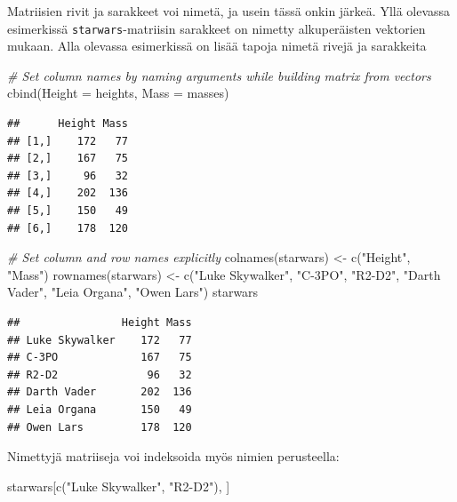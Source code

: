 \documentclass[
]{book}
\newenvironment{Shaded}{\begin{snugshade}}{\end{snugshade}}
\newcommand{\AttributeTok}[1]{\textcolor[rgb]{0.77,0.63,0.00}{#1}}
\newcommand{\CommentTok}[1]{\textcolor[rgb]{0.56,0.35,0.01}{\textit{#1}}}
\newcommand{\FunctionTok}[1]{\textcolor[rgb]{0.00,0.00,0.00}{#1}}
\newcommand{\NormalTok}[1]{#1}
\newcommand{\OtherTok}[1]{\textcolor[rgb]{0.56,0.35,0.01}{#1}}
\newcommand{\StringTok}[1]{\textcolor[rgb]{0.31,0.60,0.02}{#1}}
\begin{document}
Matriisien rivit ja sarakkeet voi nimetä, ja usein tässä onkin järkeä. Yllä olevassa esimerkissä \texttt{starwars}-matriisin sarakkeet on nimetty alkuperäisten vektorien mukaan. Alla olevassa esimerkissä on lisää tapoja nimetä rivejä ja sarakkeita

\begin{Shaded}
\begin{Highlighting}[]
\CommentTok{\# Set column names by naming arguments while building matrix from vectors}
\FunctionTok{cbind}\NormalTok{(}\AttributeTok{Height =}\NormalTok{ heights, }\AttributeTok{Mass =}\NormalTok{ masses)}
\end{Highlighting}
\end{Shaded}

\begin{verbatim}
##      Height Mass
## [1,]    172   77
## [2,]    167   75
## [3,]     96   32
## [4,]    202  136
## [5,]    150   49
## [6,]    178  120
\end{verbatim}

\begin{Shaded}
\begin{Highlighting}[]
\CommentTok{\# Set column and row names explicitly}
\FunctionTok{colnames}\NormalTok{(starwars) }\OtherTok{\textless{}{-}} \FunctionTok{c}\NormalTok{(}\StringTok{"Height"}\NormalTok{, }\StringTok{"Mass"}\NormalTok{)}
\FunctionTok{rownames}\NormalTok{(starwars) }\OtherTok{\textless{}{-}} \FunctionTok{c}\NormalTok{(}\StringTok{"Luke Skywalker"}\NormalTok{, }\StringTok{"C{-}3PO"}\NormalTok{, }\StringTok{"R2{-}D2"}\NormalTok{, }\StringTok{"Darth Vader"}\NormalTok{, }\StringTok{"Leia Organa"}\NormalTok{, }\StringTok{"Owen Lars"}\NormalTok{)}
\NormalTok{starwars}
\end{Highlighting}
\end{Shaded}

\begin{verbatim}
##                Height Mass
## Luke Skywalker    172   77
## C-3PO             167   75
## R2-D2              96   32
## Darth Vader       202  136
## Leia Organa       150   49
## Owen Lars         178  120
\end{verbatim}

Nimettyjä matriiseja voi indeksoida myös nimien perusteella:

\begin{Shaded}
\begin{Highlighting}[]
\NormalTok{starwars[}\FunctionTok{c}\NormalTok{(}\StringTok{"Luke Skywalker"}\NormalTok{, }\StringTok{"R2{-}D2"}\NormalTok{), ]}
\end{Highlighting}
\end{Shaded}
\end{document}
